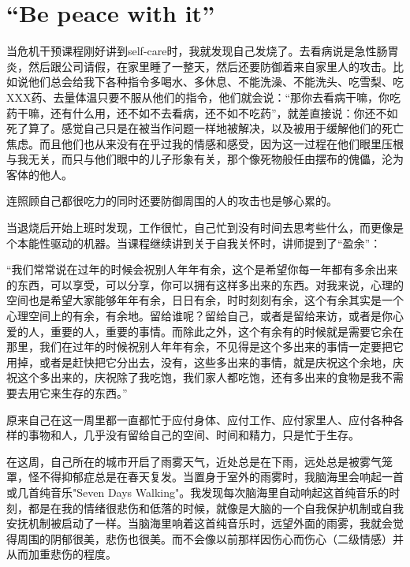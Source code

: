 \chapter{“Be peace with it”}



当危机干预课程刚好讲到self-care时，我就发现自己发烧了。去看病说是急性肠胃炎，然后跟公司请假，在家里睡了一整天，然后还要防御着来自家里人的攻击。比如说他们总会给我下各种指令\pozhehao{}多喝水、多休息、不能洗澡、不能洗头、吃雪梨、吃XXX药、去量体温\pozhehao{}只要不服从他们的指令，他们就会说：“那你去看病干嘛，你吃药干嘛，还有什么用，还不如不去看病，还不如不吃药”，就差直接说：你还不如死了算了。感觉自己只是在被当作问题一样地被解决，以及被用于缓解他们的死亡焦虑。而且他们也从来没有在乎过我的情感和感受，因为这一过程在他们眼里压根与我无关，而只与他们眼中的儿子形象有关，那个像死物般任由摆布的傀儡，沦为客体的他人。

连照顾自己都很吃力的同时还要防御周围的人的攻击也是够心累的。

当退烧后开始上班时发现，工作很忙，自己忙到没有时间去思考些什么，而更像是个本能性驱动的机器。当课程继续讲到关于自我关怀时，讲师提到了“盈余”：

“我们常常说在过年的时候会祝别人年年有余，这个是希望你每一年都有多余出来的东西，可以享受，可以分享，你可以拥有这样多出来的东西。对我来说，心理的空间也是希望大家能够年年有余，日日有余，时时刻刻有余，这个有余其实是一个心理空间上的有余，有余地。留给谁呢？留给自己，或者是留给来访，或者是你心爱的人，重要的人，重要的事情。而除此之外，这个有余有的时候就是需要它余在那里，我们在过年的时候祝别人年年有余，不见得是这个多出来的事情一定要把它用掉，或者是赶快把它分出去，没有，这些多出来的事情，就是庆祝这个余地，庆祝这个多出来的，庆祝除了我吃饱，我们家人都吃饱，还有多出来的食物是我不需要去用它来生存的东西。”

原来自己在这一周里都一直都忙于应付身体、应付工作、应付家里人、应付各种各样的事物和人，几乎没有留给自己的空间、时间和精力，只是忙于生存。



在这周，自己所在的城市开启了雨雾天气，近处总是在下雨，远处总是被雾气笼罩，怪不得抑郁症总是在春天复发。当置身于室外的雨雾时，我脑海里会响起一首或几首纯音乐\pozhehao{}"Seven Days Walking"。我发现每次脑海里自动响起这首纯音乐的时刻，都是在我的情绪很悲伤和低落的时候，就像是大脑的一个自我保护机制或自我安抚机制被启动了一样。当脑海里响着这首纯音乐时，远望外面的雨雾，我就会觉得周围的阴郁很美，悲伤也很美。而不会像以前那样因伤心而伤心（二级情感）并从而加重悲伤的程度。

